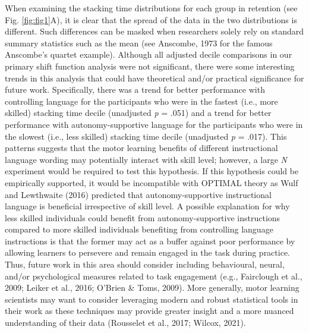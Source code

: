 \documentclass[
  doc, donotrepeattitle,floatsintext]{apa7}
\begin{document}
When examining the stacking time distributions for each group in retention (see Fig. \ref{fig:fig1}A), it is clear that the spread of the data in the two distributions is different. Such differences can be masked when researchers solely rely on standard summary statistics such as the mean (see Anscombe, 1973 for the famous Anscombe's quartet example). Although all adjusted decile comparisons in our primary shift function analysis were not significant, there were some interesting trends in this analysis that could have theoretical and/or practical significance for future work. Specifically, there was a trend for better performance with controlling language for the participants who were in the fastest (i.e., more skilled) stacking time decile (unadjusted \emph{p} = .051) and a trend for better performance with autonomy-supportive language for the participants who were in the slowest (i.e., less skilled) stacking time decile (unadjusted \emph{p} = .017). This patterns suggests that the motor learning benefits of different instructional language wording may potentially interact with skill level; however, a large \emph{N} experiment would be required to test this hypothesis. If this hypothesis could be empirically supported, it would be incompatible with OPTIMAL theory as Wulf and Lewthwaite (2016) predicted that autonomy-supportive instructional language is beneficial irrespective of skill level. A possible explanation for why less skilled individuals could benefit from autonomy-supportive instructions compared to more skilled individuals benefiting from controlling language instructions is that the former may act as a buffer against poor performance by allowing learners to persevere and remain engaged in the task during practice. Thus, future work in this area should consider including behavioural, neural, and/or psychological measures related to task engagement (e.g., Fairclough et al., 2009; Leiker et al., 2016; O'Brien \& Toms, 2009). More generally, motor learning scientists may want to consider leveraging modern and robust statistical tools in their work as these techniques may provide greater insight and a more nuanced understanding of their data (Rousselet et al., 2017; Wilcox, 2021).
\end{document}
